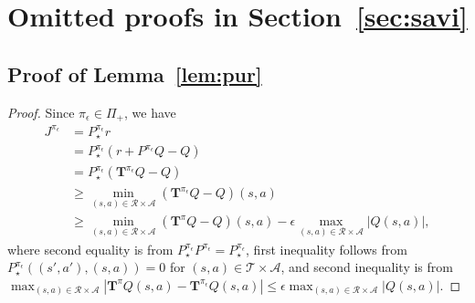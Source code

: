 \documentclass{article}
\theoremstyle{definition}
\theoremstyle{remark}
\newcommand{\cA}{\mathcal{A}}
\newcommand{\cR}{\mathcal{R}}
\newcommand{\T}{\mathbf{T}}
\newcommand{\cT}{\mathcal{T}}
\newcommand*{\infn}[1]{\left\|{#1}\right\|_{\infty}}
\begin{document}
\section{Omitted proofs in Section~\ref{sec:savi}}\label{omit:sec3}


\subsection{Proof of Lemma~\ref{lem:pur}}
\begin{proof}
Since $\pi_\epsilon \in \Pi_+$, we have
\begin{align*}
    J^{\pi_\epsilon} &= P^{\pi_\epsilon}_\star r
    \\&= P^{\pi_\epsilon}_\star (r+P^{\pi_\epsilon} Q-Q)
    \\&= P^{\pi_\epsilon}_\star (\T^{\pi_\epsilon} Q-Q)
    \\&\ge \min_{(s,a) \in \cR \times \cA} {(\T^{\pi_\epsilon} Q-Q)(s,a)} 
    \\&\ge \min_{(s,a) \in \cR \times \cA}{(\T^{\pi} Q-Q)(s,a)} -\epsilon \max_{(s,a) \in \cR \times \cA}|Q(s,a)|,
\end{align*}
where second equality is from  $P^{\pi_\epsilon}_\star P^{\pi_\epsilon} = P^{\pi_\epsilon}_\star$, first inequality follows from  $P^{\pi_\epsilon}_\star((s',a'), (s,a))=0$ for $(s,a) \in \cT \times \cA$, and second inequality is from $\max_{(s,a) \in \cR \times \cA}|\T^\pi Q(s,a)-\T^{\pi_\epsilon} Q(s,a)|\le \epsilon \max_{(s,a) \in \cR \times \cA}|Q(s,a)|$.


\end{proof}
\end{document}
